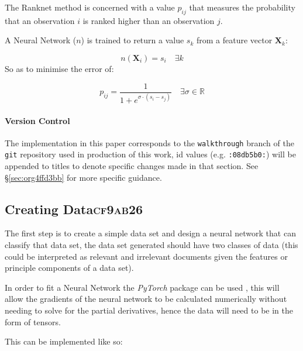 \documentclass[a4paper,11pt,twoside]{article}
\begin{document}
The Ranknet method is concerned with a value \(p_{ij}\) that
measures the probability that an observation \(i\) is ranked higher
than an observation \(j\).

A Neural Network (\(n\)) is trained to return a value
\(s_k\) from a feature vector \(\mathbf{X}_k\):

 \[n(\mathbf{X}_i) = s_i \quad \exists k\]
So as to minimise the error of:


\[
  p_{ij} = \frac{1}{1+e^{\sigma \cdot (s_i-s_j)}} \quad \exists \sigma
  \in \mathbb{R}
  \]


\paragraph{Version Control}
\label{sec:orgbbdfd3f}
The implementation in this paper corresponds to the \texttt{walkthrough} branch
of the \texttt{git} repository used in production of this work, id values
(e.g. \texttt{:08db5b0:}) will be appended to titles to denote specific
changes made in that section. See \S \ref{sec:org4ffd3bb} for
more specific guidance.

\subsection{Creating Data\hfill{}\textsc{cf9ab26}}
\label{sec:org2590bdd}
The first step is to create a simple data set and design a neural
network that can classify that data set, the data set generated
should have two classes of data (this could be interpreted as
relevant and irrelevant documents given the features or principle
components of a data set). 

In order to fit a Neural Network the \emph{PyTorch} package can be used
\cite{NEURIPS2019_9015}, this will allow the gradients of the neural
network to be calculated numerically without needing to solve for
the partial derivatives, hence the data will need to be in the
form of tensors.

This can be implemented like so:
\end{document}
